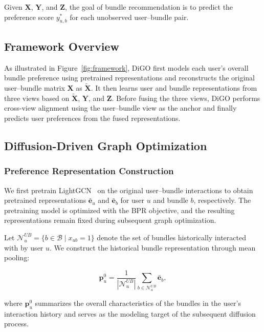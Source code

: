 \documentclass[letterpaper]{article}
\begin{document}
Given $\mathbf X$, $\mathbf Y$, and $\mathbf Z$, the goal of
bundle recommendation is to predict the preference score
$y^*_{u,b}$ for each unobserved user--bundle pair.


\subsection{Framework Overview}

As illustrated in Figure~\ref{fig:framework}, DiGO first models
each user's overall bundle preference using pretrained
representations and reconstructs the original user--bundle matrix
$\mathbf X$ as $\widetilde{\mathbf X}$. It then learns user and
bundle representations from three views based on
$\widetilde{\mathbf X}$, $\mathbf Y$, and $\mathbf Z$. Before
fusing the three views, DiGO performs cross-view alignment using
the user--bundle view as the anchor and finally predicts user
preferences from the fused representations.


\subsection{Diffusion-Driven Graph Optimization}

\subsubsection{Preference Representation Construction}

We first pretrain LightGCN~\cite{he2020lightgcn} on the original
user--bundle interactions to obtain pretrained representations
$\bar{\mathbf e}_u$ and $\bar{\mathbf e}_b$ for user $u$ and
bundle $b$, respectively. The pretraining model is optimized with
the BPR objective, and the resulting representations remain fixed
during subsequent graph optimization.

Let
$\mathcal N_u^{UB}
=
\{b\in\mathcal B\mid x_{ub}=1\}$
denote the set of bundles historically interacted with by user
$u$. We construct the historical bundle representation through
mean pooling:

\begin{equation}
\mathbf p_u^0
=
\frac{1}{|\mathcal N_u^{UB}|}
\sum_{b\in\mathcal N_u^{UB}}
\bar{\mathbf e}_b ,
\tag{1}
\end{equation}

where $\mathbf p_u^0$ summarizes the overall characteristics of
the bundles in the user's interaction history and serves as the
modeling target of the subsequent diffusion process.
\end{document}
